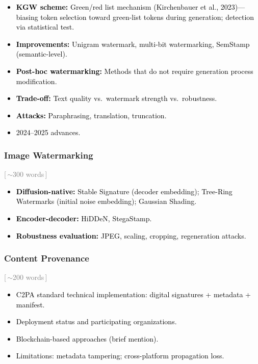 \documentclass[preprint,12pt]{elsarticle}
\newcommand{\wordcount}[1]{\hfill\textcolor{gray}{\small[\,#1\,]}}
\newcommand{\outline}[1]{\textcolor{black}{#1}}
\begin{document}
\outline{%
\begin{itemize}[nosep,leftmargin=1.5em]
    \item \textbf{KGW scheme:} Green/red list mechanism (Kirchenbauer et al., 2023)---biasing token selection toward green-list tokens during generation; detection via statistical test.
    \item \textbf{Improvements:} Unigram watermark, multi-bit watermarking, SemStamp (semantic-level).
    \item \textbf{Post-hoc watermarking:} Methods that do not require generation process modification.
    \item \textbf{Trade-off:} Text quality vs.\ watermark strength vs.\ robustness.
    \item \textbf{Attacks:} Paraphrasing, translation, truncation.
    \item 2024--2025 advances.
\end{itemize}
}

\subsubsection{Image Watermarking} \wordcount{$\sim$300 words}

\outline{%
\begin{itemize}[nosep,leftmargin=1.5em]
    \item \textbf{Diffusion-native:} Stable Signature (decoder embedding); Tree-Ring Watermarks (initial noise embedding); Gaussian Shading.
    \item \textbf{Encoder-decoder:} HiDDeN, StegaStamp.
    \item \textbf{Robustness evaluation:} JPEG, scaling, cropping, regeneration attacks.
\end{itemize}
}

\subsubsection{Content Provenance} \wordcount{$\sim$200 words}

\outline{%
\begin{itemize}[nosep,leftmargin=1.5em]
    \item C2PA standard technical implementation: digital signatures + metadata + manifest.
    \item Deployment status and participating organizations.
    \item Blockchain-based approaches (brief mention).
    \item Limitations: metadata tampering; cross-platform propagation loss.
\end{itemize}
}
\end{document}
